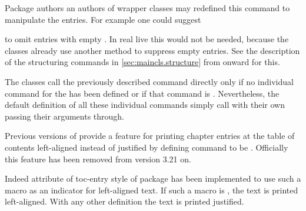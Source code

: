 Package authors an authors of wrapper classes may redefined this command to
manipulate the entries. For example one could suggest
\begin{lstcode}
  \renewcommand{\addtocentrydefault}[3]{%
    \ifstr{#3}{}{%
      \ifstr{#2}{}{%
        \addcontentsline{toc}{#1}{#3}%
      }{%
        \addcontentsline{toc}{#1}{\protect\numberline{#2}#3}%
      }%
    }%
  }%
\end{lstcode}
to omit entries with empty . In real live this would not be
needed, because the \KOMAScript{} classes already use another method to
suppress empty entries. See the description of the structuring commands in
\autoref{sec:maincls.structure} from 
onward for this.%
%
\EndIndexGroup


\begin{Declaration}
\end{Declaration}%
The \KOMAScript{} classes call the previously described
command %
 directly only if no individual command
for the  has been defined or if that command is
. Nevertheless, the
default definition of all these individual commands simply call
 with their own  passing their
arguments through.%
%
\EndIndexGroup


\begin{Declaration}
\end{Declaration}
Previous versions of
\KOMAScript{} provide a feature for printing chapter entries at the table of
contents left-aligned instead of justified by defining command
 to be . Officially this feature
has been removed from \KOMAScript{} version 3.21 on.

Indeed attribute  of toc-entry style 
of package  has been implemented to
use such a macro  as an indicator for
left-aligned text. If such a macro is , the text is printed
left-aligned. With any other definition the text is printed justified.

